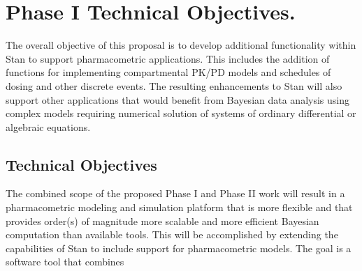 
\section{Phase I Technical Objectives.}


The overall objective of this proposal is to develop additional
functionality within Stan to support pharmacometric applications. This
includes the addition of functions for implementing compartmental PK/PD
models and schedules of dosing and other discrete events. The
resulting enhancements to Stan will also support other applications
that would benefit from Bayesian data analysis using complex models
requiring numerical solution of systems of ordinary differential or
algebraic equations.

\subsection{Technical Objectives}

The combined scope of the proposed Phase I and Phase II work will
result in a pharmacometric modeling and simulation platform that is
more flexible and that provides order(s) of magnitude more scalable
and more efficient Bayesian computation than available tools. This
will be accomplished by extending the capabilities of Stan to include
support for pharmacometric models. The goal is a software tool that
combines 

